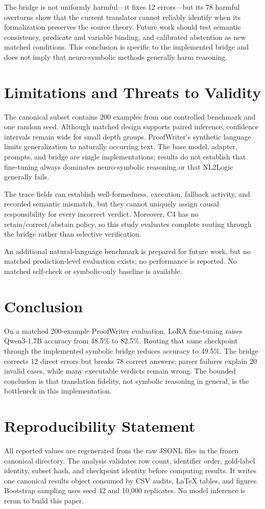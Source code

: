 \documentclass[conference]{IEEEtran}
\begin{document}
The bridge is not uniformly harmful---it fixes 12 errors---but its 78 harmful overturns show that the current translator cannot reliably identify when its formalization preserves the source theory. Future work should test semantic consistency, predicate and variable binding, and calibrated abstention as new matched conditions. This conclusion is specific to the implemented bridge and does not imply that neuro-symbolic methods generally harm reasoning.

\section{Limitations and Threats to Validity}
The canonical subset contains 200 examples from one controlled benchmark and one random seed. Although matched design supports paired inference, confidence intervals remain wide for small depth groups. ProofWriter's synthetic language limits generalization to naturally occurring text. The base model, adapter, prompts, and bridge are single implementations; results do not establish that fine-tuning always dominates neuro-symbolic reasoning or that NL2Logic generally fails.

The trace fields can establish well-formedness, execution, fallback activity, and recorded semantic mismatch, but they cannot uniquely assign causal responsibility for every incorrect verdict. Moreover, C4 has no retain/correct/abstain policy, so this study evaluates complete routing through the bridge rather than selective verification.

An additional natural-language benchmark is prepared for future work, but no matched prediction-level evaluation exists; no performance is reported. No matched self-check or symbolic-only baseline is available.

\section{Conclusion}
On a matched 200-example ProofWriter evaluation, LoRA fine-tuning raises Qwen3-1.7B accuracy from 48.5\% to 82.5\%. Routing that same checkpoint through the implemented symbolic bridge reduces accuracy to 49.5\%. The bridge corrects 12 direct errors but breaks 78 correct answers; parser failures explain 20 invalid cases, while many executable verdicts remain wrong. The bounded conclusion is that translation fidelity, not symbolic reasoning in general, is the bottleneck in this implementation.

\section*{Reproducibility Statement}
All reported values are regenerated from the raw JSONL files in the frozen canonical directory. The analysis validates row count, identifier order, gold-label identity, subset hash, and checkpoint identity before computing results. It writes one canonical results object consumed by CSV audits, LaTeX tables, and figures. Bootstrap sampling uses seed 42 and 10,000 replicates. No model inference is rerun to build this paper.



\end{document}
